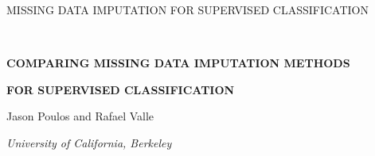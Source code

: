 \documentclass[10pt]{book}
\theoremstyle{definition}
\begin{document}

\renewcommand{\baselinestretch}{2}


{\hfill {\footnotesize\rm MISSING DATA IMPUTATION FOR SUPERVISED CLASSIFICATION} \hfill}

\renewcommand{\thefootnote}{}
$\ $\par


\fontsize{12}{14pt plus.8pt minus .6pt}\selectfont \vspace{0.8pc}
\centerline{\large\bf COMPARING MISSING DATA IMPUTATION METHODS}
\vspace{2pt} \centerline{\large\bf  FOR SUPERVISED CLASSIFICATION}
\vspace{.4cm} \centerline{Jason Poulos and Rafael Valle} \vspace{.4cm} \centerline{\it
University of California, Berkeley} \vspace{.55cm} \fontsize{9}{11.5pt plus.8pt minus
.6pt}\selectfont

\end{document}
